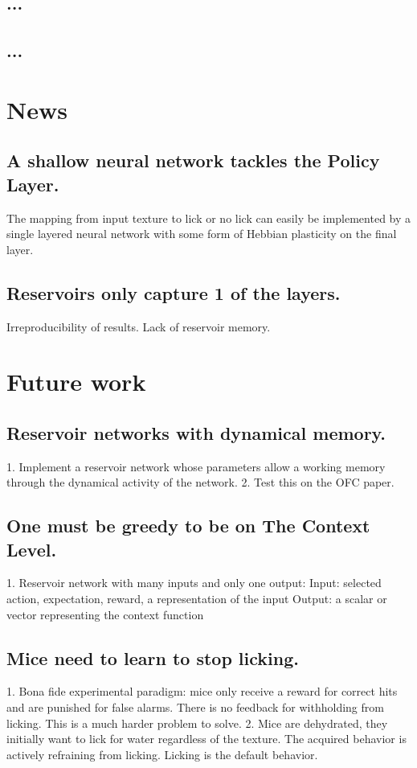 \documentclass[]{article}
\begin{document}
\subsection{...}

\subsection{...}

\section{News}

\subsection{A shallow neural network tackles the Policy Layer.}
The mapping from input texture to lick or no lick can easily be implemented by a single layered neural network with some form of Hebbian plasticity on the final layer.

\subsection{Reservoirs only capture 1 of the layers.}
Irreproducibility of results.
Lack of reservoir memory.

\section{Future work}

\subsection{Reservoir networks with dynamical memory.}
1. Implement a reservoir network whose parameters allow a working memory through the dynamical activity of the network.
2. Test this on the OFC paper.

\subsection{One must be greedy to be on The Context Level.}
1. Reservoir network with many inputs and only one output:
Input: selected action, expectation, reward, a representation of the input
Output: a scalar or vector representing the context function

\subsection{Mice need to learn to stop licking.}
1. Bona fide experimental paradigm: mice only receive a reward for correct hits and are punished for false alarms.  There is no feedback for withholding from licking.  This is a much harder problem to solve.
2. Mice are dehydrated, they initially want to lick for water regardless of the texture.  The acquired behavior is actively refraining from licking.  Licking is the default behavior.
\end{document}
